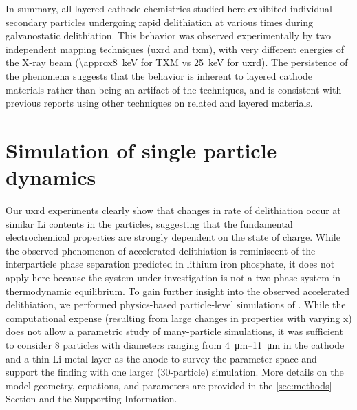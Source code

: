 \documentclass{article}
\begin{document}
In summary, all layered cathode chemistries studied here exhibited
individual secondary particles undergoing rapid delithiation at
various times during galvanostatic delithiation. This behavior was
observed experimentally by two independent mapping techniques
(\gls{uxrd} and \gls{txm}), with very different energies of the X-ray beam
(\SI{\approx8}{\kilo\electronvolt} for TXM vs
\SI{25}{\kilo\electronvolt} for \gls{uxrd}). The persistence of the
phenomena suggests that the behavior is inherent
to layered cathode materials rather than being an artifact of the
techniques, and is consistent with previous reports using other
techniques on related \nmc{} and  layered
materials\cite{chueh2021,rao2021,wang2020-6}.


\section{Simulation of single particle dynamics}


Our \gls{uxrd} experiments clearly show that changes in rate of
delithiation occur at similar Li contents in the particles, suggesting
that the fundamental electrochemical properties are strongly dependent
on the state of charge. While the observed phenomenon of accelerated
delithiation is reminiscent of the interparticle phase separation
predicted in lithium iron phosphate\cite{boesenberg2013,thornton2014},
it does not apply here because the system under investigation is not a
two-phase system in thermodynamic equilibrium. To gain further insight
into the observed accelerated delithiation, we performed physics-based
particle-level simulations of . While the computational expense
(resulting from large changes in properties with varying x) does not
allow a parametric study of many-particle simulations, it was
sufficient to consider 8 particles with diameters ranging from
\SIrange{4}{11}{\micro\meter} in the cathode and a thin Li metal layer
as the anode to survey the parameter space and support the finding
with one larger (30-particle) simulation. More details on the model
geometry, equations, and parameters are provided in the
\ref{sec:methods} Section and the Supporting Information.
\end{document}
